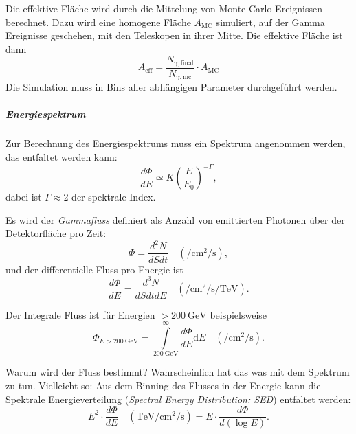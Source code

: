 Die effektive Fläche wird durch die Mittelung von Monte Carlo-Ereignissen
berechnet.
Dazu wird eine homogene Fläche $A_{\text{MC}}$ simuliert,
auf der Gamma Ereignisse geschehen,
mit den Teleskopen in ihrer Mitte.
Die effektive Fläche ist dann
\begin{equation}%
  \label{eq:effective_area}
  A_{\text{eff}} =
    \frac{N_{\gamma,\text{final}}}{N_{\gamma,\text{mc}}}
    \cdot A_{\text{MC}}
\end{equation}
Die Simulation muss in Bins aller abhängigen Parameter durchgeführt werden.



\subparagraph{Energiespektrum}

Zur Berechnung des Energiespektrums muss ein Spektrum angenommen werden,
das entfaltet werden kann:
\begin{equation}%
  \label{eq:photon_index}
  \frac{d\Phi}{dE} \simeq K {\left(\frac{E}{E_0}\right)}^{-\Gamma},
\end{equation}
dabei ist $\Gamma \approx 2$ der spektrale Index.

Es wird der \textit{Gammafluss} definiert als Anzahl von emittierten Photonen
über der Detektorfläche pro Zeit:
\begin{equation}%
  \label{eq:gamma_flux}
  \Phi = \frac{d^2 N}{dS dt}
  \quad \left(\si{\per\centi\meter\tothe2\per\second}\right),
\end{equation}
und der differentielle Fluss pro Energie ist
\begin{equation}%
  \label{eq:differential_energy_spectrum}
  \frac{d\Phi}{dE} = \frac{d^3N}{dS dt dE}
  \quad \left(\si{\per\centi\meter\tothe2\per\second\per\tera\electronvolt}\right).
\end{equation}

Der Integrale Fluss ist für Energien $> \SI{200}{\giga\electronvolt}$
beispielsweise
\begin{equation}%
  \label{eq:integral_flux}
  \Phi_{E > \SI{200}{\giga\electronvolt}} =
    \int\limits_{\SI{200}{\giga\electronvolt}}^{\infty} \frac{d \Phi}{dE}
    \text{d} E
  \quad \left(\si{\per\centi\meter\tothe2\per\second}\right).
\end{equation}

{\color{red} Warum wird der Fluss bestimmt? Wahrscheinlich hat das was mit dem
Spektrum zu tun. Vielleicht so:}
Aus dem Binning des Flusses in der Energie
kann die Spektrale Energieverteilung
(\textit{Spectral Energy Distribution: SED})
entfaltet werden:
\begin{equation}%
  \label{eq:spectral_energy_distribution}
  E^2 \cdot \frac{d \Phi}{dE}
  \quad \left(\si{\tera\electronvolt\per\centi\meter\tothe2\per\second}\right)
  = E \cdot \frac{d \Phi}{d \left(\log E\right)}.
\end{equation}

